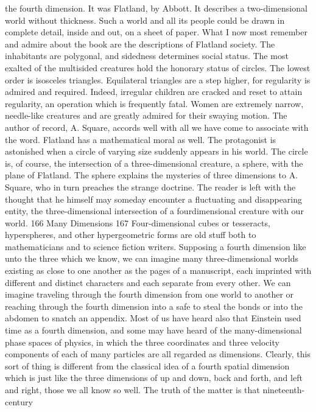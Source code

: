 {{{{{{{{{{the fourth dimension. It was Flatland, by Abbott. It describes a
two-dimensional world without thickness. Such a world and all its
people could be drawn in complete detail, inside and out, on a
sheet of paper.
What I now most remember and admire about the book are the
descriptions of Flatland society. The inhabitants are polygonal,
and sidedness determines social status. The most exalted of the
multisided creatures hold the honorary status of circles. The lowest
order is isosceles triangles. Equilateral triangles are a step higher,
for regularity is admired and required. Indeed, irregular children
are cracked and reset to attain regularity, an operation which is
frequently fatal. Women are extremely narrow, needle-like creatures
and are greatly admired for their swaying motion. The author
of record, A. Square, accords well with all we have come to
associate with the word.
Flatland has a mathematical moral as well. The protagonist is
astonished when a circle of varying size suddenly appears in his
world. The circle is, of course, the intersection of a three-dimensional
creature, a sphere, with the plane of Flatland. The sphere
explains the mysteries of three dimensions to A. Square, who in
turn preaches the strange doctrine. The reader is left with the
thought that he himself may someday encounter a fluctuating and
disappearing entity, the three-dimensional intersection of a fourdimensional
creature with our world.
166
Many Dimensions
167
Four-dimensional cubes or tesseracts, hyperspheres, and other
hypergeometric forms are old stuff both to mathematicians and to
science fiction writers. Supposing a fourth dimension like unto the
three which we know, we can imagine many three-dimensional
worlds existing as close to one another as the pages of a manuscript,
each imprinted with different and distinct characters and
each separate from every other. We can imagine traveling through
the fourth dimension from one world to another or reaching
through the fourth dimension into a safe to steal the bonds or into
the abdomen to snatch an appendix.
Most of us have heard also that Einstein used time as a fourth
dimension, and some may have heard of the many-dimensional
phase spaces of physics, in which the three coordinates and three
velocity components of each of many particles are all regarded
as dimensions.
Clearly, this sort of thing is different from the classical idea of
a fourth spatial dimension which is just like the three dimensions
of up and down, back and forth, and left and right, those we all
know so well. The truth of the matter is that nineteenth-century
}}}}}}}}}}
